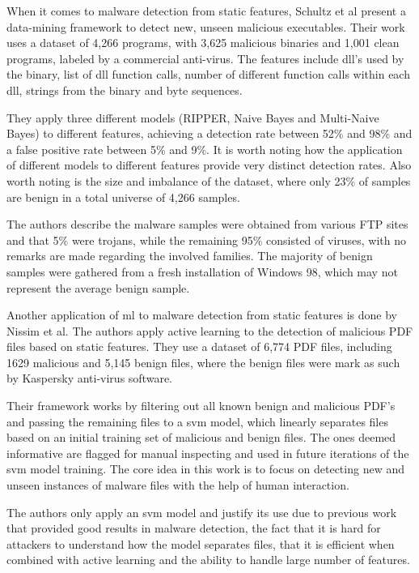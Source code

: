 When it comes to malware detection from static features, Schultz et al\cite{schultz:data_mining} present a data-mining framework to detect new, unseen malicious executables. Their work uses a dataset of 4,266 programs, with 3,625 malicious binaries and 1,001 clean programs, labeled by a commercial anti-virus. The features include \gls{dll}'s used by the binary, list of \gls{dll} function calls, number of different function calls within each \gls{dll}, strings from the binary and byte sequences.

They apply three different models (RIPPER, Naive Bayes and Multi-Naive Bayes) to different features, achieving a detection rate between 52\% and 98\% and a false positive rate between 5\% and 9\%. It is worth noting how the application of different models to different features provide very distinct detection rates. Also worth noting is the size and imbalance of the dataset, where only 23\% of samples are benign in a total universe of 4,266 samples.

The authors describe the malware samples were obtained from various FTP sites and that 5\% were trojans, while the remaining 95\% consisted of viruses, with no remarks are made regarding the involved families. The majority of benign samples were gathered from a fresh installation of Windows 98, which may not represent the average benign sample.

Another application of \gls{ml} to malware detection from static features is done by Nissim et al\cite{nissim:al_pdf}. The authors apply active learning to the detection of malicious PDF files based on static features. They use a dataset of 6,774 PDF files, including 1629 malicious and 5,145 benign files, where the benign files were mark as such by Kaspersky anti-virus software.

Their framework works by filtering out all known benign and malicious PDF's and passing the remaining files to a \gls{svm} model, which linearly separates files based on an initial training set of malicious and benign files. The ones deemed informative are flagged for manual inspecting and used in future iterations of the \gls{svm} model training. The core idea in this work is to focus on detecting new and unseen instances of malware files with the help of human interaction.

The authors only apply an \gls{svm} model and justify its use due to previous work that provided good results in malware detection, the fact that it is hard for attackers to understand how the model separates files, that it is efficient when combined with active learning and the ability to handle large number of features.

